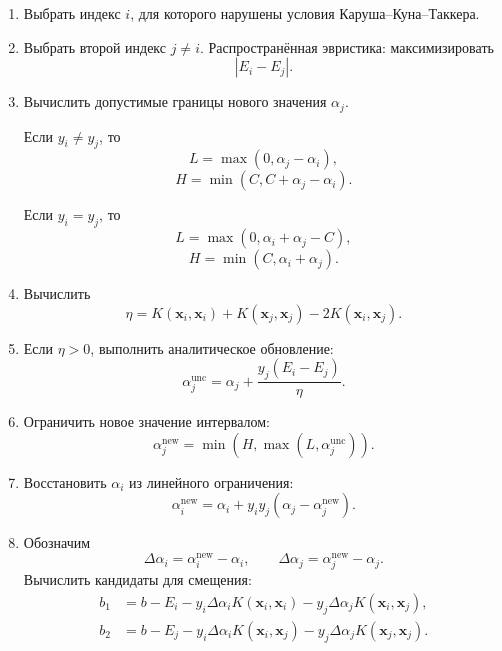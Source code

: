 \documentclass[12pt,a4paper]{article}
\theoremstyle{definition}
\newcommand{\1}{\mathbf{1}}
\begin{document}
\begin{enumerate}[label=\arabic*.]
    \item Выбрать индекс $i$, для которого нарушены условия
    Каруша--Куна--Таккера.

    \item Выбрать второй индекс $j\neq i$. Распространённая эвристика:
    максимизировать
    \[
        |E_i-E_j|.
    \]

    \item Вычислить допустимые границы нового значения $\alpha_j$.

    Если $y_i\neq y_j$, то
    \[
        L=\max(0,\alpha_j-\alpha_i),
    \]
    \[
        H=\min(C,C+\alpha_j-\alpha_i).
    \]

    Если $y_i=y_j$, то
    \[
        L=\max(0,\alpha_i+\alpha_j-C),
    \]
    \[
        H=\min(C,\alpha_i+\alpha_j).
    \]

    \item Вычислить
    \[
        \eta
        =
        K(\bm{x}_i,\bm{x}_i)
        +
        K(\bm{x}_j,\bm{x}_j)
        -
        2K(\bm{x}_i,\bm{x}_j).
    \]

    \item Если $\eta>0$, выполнить аналитическое обновление:
    \[
        \alpha_j^{\mathrm{unc}}
        =
        \alpha_j
        +
        \frac{y_j(E_i-E_j)}{\eta}.
    \]

    \item Ограничить новое значение интервалом:
    \[
        \alpha_j^{\mathrm{new}}
        =
        \min\left(
            H,
            \max(L,\alpha_j^{\mathrm{unc}})
        \right).
    \]

    \item Восстановить $\alpha_i$ из линейного ограничения:
    \[
        \alpha_i^{\mathrm{new}}
        =
        \alpha_i
        +
        y_iy_j
        \left(
            \alpha_j-\alpha_j^{\mathrm{new}}
        \right).
    \]

    \item Обозначим
    \[
        \Delta\alpha_i
        =
        \alpha_i^{\mathrm{new}}-\alpha_i,
        \qquad
        \Delta\alpha_j
        =
        \alpha_j^{\mathrm{new}}-\alpha_j.
    \]
    Вычислить кандидаты для смещения:
    \[
    \begin{aligned}
        b_1
        &=
        b-E_i
        -y_i\Delta\alpha_iK(\bm{x}_i,\bm{x}_i)
        -y_j\Delta\alpha_jK(\bm{x}_i,\bm{x}_j),\\
        b_2
        &=
        b-E_j
        -y_i\Delta\alpha_iK(\bm{x}_i,\bm{x}_j)
        -y_j\Delta\alpha_jK(\bm{x}_j,\bm{x}_j).
    \end{aligned}
    \]


\end{enumerate}
\end{document}
